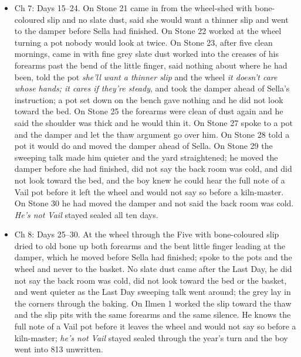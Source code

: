 \documentclass{design/chronicle}
\begin{document}
{\begin{itemize}[leftmargin=1.4em,itemsep=1pt,topsep=3pt,parsep=0pt]
\item Ch 7: Days 15--24. On Stone 21 came in from the wheel-shed with bone-coloured slip and no slate dust, said she would want a thinner slip and went to the damper before Sella had finished. On Stone 22 worked at the wheel turning a pot nobody would look at twice. On Stone 23, after five clean mornings, came in with fine grey slate dust worked into the creases of his forearms past the bend of the little finger, said nothing about where he had been, told the pot \emph{she’ll want a thinner slip} and the wheel \emph{it doesn’t care whose hands; it cares if they’re steady}, and took the damper ahead of Sella’s instruction; a pot set down on the bench gave nothing and he did not look toward the bed. On Stone 25 the forearms were clean of dust again and he said the shoulder was thick and he would thin it. On Stone 27 spoke to a pot and the damper and let the thaw argument go over him. On Stone 28 told a pot it would do and moved the damper ahead of Sella. On Stone 29 the sweeping talk made him quieter and the yard straightened; he moved the damper before she had finished, did not say the back room was cold, and did not look toward the bed, and the boy knew he could hear the full note of a Vail pot before it left the wheel and would not say so before a kiln-master. On Stone 30 he had moved the damper and not said the back room was cold. \emph{He’s not Vail} stayed sealed all ten days.

\end{itemize}

\begin{itemize}[leftmargin=1.4em,itemsep=1pt,topsep=3pt,parsep=0pt]

\item Ch 8: Days 25--30. At the wheel through the Five with bone-coloured slip dried to old bone up both forearms and the bent little finger leading at the damper, which he moved before Sella had finished; spoke to the pots and the wheel and never to the basket. No slate dust came after the Last Day, he did not say the back room was cold, did not look toward the bed or the basket, and went quieter as the Last Day sweeping talk went around; the grey lay in the corners through the baking. On Ilmen 1 worked the slip toward the thaw and the slip pits with the same forearms and the same silence. He knows the full note of a Vail pot before it leaves the wheel and would not say so before a kiln-master; \emph{he’s not Vail} stayed sealed through the year’s turn and the boy went into 813 unwritten.


\end{itemize}}
\end{document}
